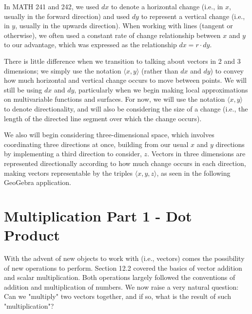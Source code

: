 \documentclass{ximera}
\begin{document}
In MATH 241 and 242, we used $dx$ to denote a horizontal change (i.e., in $x$, usually in the forward direction) and used $dy$ to represent a vertical change (i.e., in $y$, usually in the upwards direction). When working with lines (tangent or otherwise), we often used a constant rate of change relationship between $x$ and $y$ to our advantage, which was expressed as the relationship $dx=r\cdot dy$.

There is little difference when we transition to talking about vectors in 2 and 3 dimensions; we simply use the notation $\langle x,y\rangle$ (rather than $dx$ and $dy$) to convey how much horizontal and vertical change occurs to move between points. We will still be using $dx$ and $dy$, particularly when we begin making local approximations on multivariable functions and surfaces. For now, we will use the notation $\langle x,y\rangle$ to denote directionality, and will also be considering the size of a change (i.e., the length of the directed line segment over which the change occurs).

We also will begin considering three-dimensional space, which involves coordinating three directions at once, building from our usual $x$ and $y$ directions by implementing a third direction to consider, $z$. Vectors in three dimensions are represented directionally according to how much change occurs in each direction, making vectors representable by the triples $\langle x,y,z\rangle$, as seen in the following GeoGebra application.

\begin{center}
\end{center}


\begin{multipleChoice}
\end{multipleChoice}

\section*{Multiplication Part 1 - Dot Product}

With the advent of new objects to work with (i.e., vectors) comes the possibility of new operations to perform. Section 12.2 covered the basics of vector addition and scalar multiplication. Both operations largely followed the conventions of addition and multiplication of numbers. We now raise a very natural question: Can we "multiply" two vectors together, and if so, what is the result of such "multiplication"?
\end{document}
